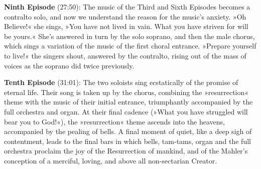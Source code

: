 \documentclass[12pt]{article}%
\begin{document}
{\bf Ninth Episode} (27:50): The music of the Third and Sixth Episodes becomes a contralto solo, and now we understand the reason for the music's anxiety. »Oh Believe!« she sings, »You have not lived in vain. What you have striven for will be yours.« She's answered in turn by the solo soprano, and then the male chorus, which sings a variation of the music of the first choral entrance. »Prepare yourself to live!« the singers shout, answered by the contralto, rising out of the mass of voices as the soprano did twice previously.

{\bf Tenth Episode} (31:01): The two soloists sing ecstatically of the promise of eternal life. Their song is taken up by the chorus, combining the
»resurrection« theme with the music of their initial entrance, triumphantly accompanied by the full orchestra and organ. At their final cadence (»What you have struggled will bear you to God!«), the »resurrection« theme ascends into the heavens, accompanied by the pealing of bells. A final moment of quiet, like a deep sigh of contentment, leads to the final bars in which bells, tam-tams, organ and the full orchestra proclaim the joy of the Resurrection of mankind, and of the Mahler's conception of a merciful, loving, and above all non-sectarian Creator.
\end{document}
